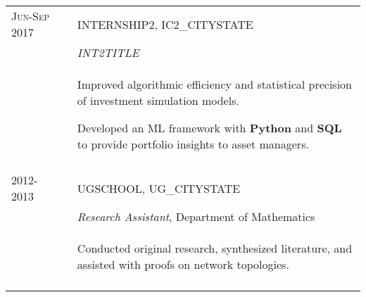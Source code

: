 \documentclass[a4paper,10pt]{article}
\begin{document}
\begin{supertabular}{l p{0.55cm} p{13.9cm}}
	\textsc{Jun-Sep 2017}	&& \textsc{INTERNSHIP2}, IC2_CITYSTATE \\
												&& \small	\emph{INT2TITLE} \\
												&& \begin{enumerate*}[label =$\diamond$, itemjoin={\newline}]
														\item \footnotesize Improved algorithmic efficiency and statistical precision of investment simulation models.
														\item \footnotesize Developed an ML framework with $\mathbf{Python}$ and $\mathbf{SQL}$ to provide portfolio insights to asset managers. \end{enumerate*} \\
	 \\



	\textsc{2012-2013}		&& \textsc{UGSCHOOL}, UG_CITYSTATE \\
	\textsc{}							&& \small	\emph{Research Assistant}, Department of Mathematics \\
												&& \begin{enumerate*}[label =$\diamond$, itemjoin={\newline}]
														\item \footnotesize Conducted original research, synthesized literature, and assisted with proofs on network topologies.
														\end{enumerate*} \\
	 \\


\end{supertabular}





\end{document}
